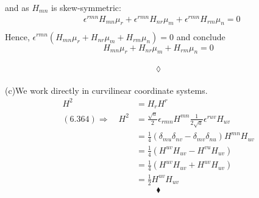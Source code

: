 and as $H_{mn}$ is skew-symmetric:
\begin{align}
&\epsilon^{rmn}H_{mn}\mu_r+\epsilon^{rmn}H_{nr}\mu_m+ \epsilon^{rmn}H_{rm}\mu_n =  0\\
\end{align}
Hence, $\epsilon^{rmn}\left(H_{mn}\mu_r+H_{nr}\mu_m+ H_{rm}\mu_n\right)=0$ and conclude 
$$H_{mn}\mu_r+H_{nr}\mu_m+ H_{rm}\mu_n=0$$\
$$\lozenge$$
\\
(c)We work directly in curvilinear coordinate systems.
\begin{align}
H^2 &= H_rH^r\\
\mathbf{(6.364)}\Rightarrow\quad H^2 &= \frac{\sqrt{a}}{2}\epsilon_{rmn}H^{mn}\frac{1}{2\sqrt{a}}\epsilon^{ruv}H_{uv}\\
&= \frac{1}{4}\left(\delta_{mu}\delta_{nv}-\delta_{mv}\delta_{nu}\right)H^{mn}H_{uv}\\
&= \frac{1}{4}\left(H^{uv}H_{uv}-H^{vu}H_{uv}\right)\\
&= \frac{1}{4}\left(H^{uv}H_{uv}+H^{uv}H_{uv}\right)\\
&= \frac{1}{2}H^{uv}H_{uv}
\end{align}
$$\blacklozenge$$
\newpage


